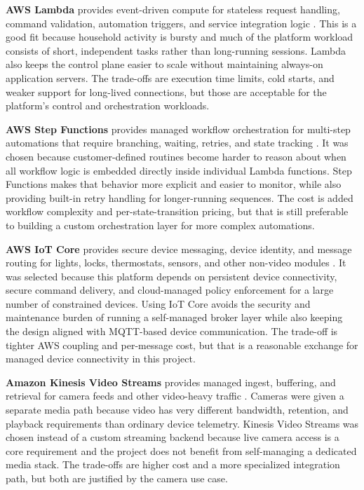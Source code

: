 \textbf{AWS Lambda} provides event-driven compute for stateless request handling, command validation, automation triggers, and service integration logic \cite{aws-lambda}. This is a good fit because household activity is bursty and much of the platform workload consists of short, independent tasks rather than long-running sessions. Lambda also keeps the control plane easier to scale without maintaining always-on application servers. The trade-offs are execution time limits, cold starts, and weaker support for long-lived connections, but those are acceptable for the platform's control and orchestration workloads.

\textbf{AWS Step Functions} provides managed workflow orchestration for multi-step automations that require branching, waiting, retries, and state tracking \cite{aws-step-functions}. It was chosen because customer-defined routines become harder to reason about when all workflow logic is embedded directly inside individual Lambda functions. Step Functions makes that behavior more explicit and easier to monitor, while also providing built-in retry handling for longer-running sequences. The cost is added workflow complexity and per-state-transition pricing, but that is still preferable to building a custom orchestration layer for more complex automations.

\textbf{AWS IoT Core} provides secure device messaging, device identity, and message routing for lights, locks, thermostats, sensors, and other non-video modules \cite{aws-iot-core}. It was selected because this platform depends on persistent device connectivity, secure command delivery, and cloud-managed policy enforcement for a large number of constrained devices. Using IoT Core avoids the security and maintenance burden of running a self-managed broker layer while also keeping the design aligned with MQTT-based device communication. The trade-off is tighter AWS coupling and per-message cost, but that is a reasonable exchange for managed device connectivity in this project.

\textbf{Amazon Kinesis Video Streams} provides managed ingest, buffering, and retrieval for camera feeds and other video-heavy traffic \cite{aws-kinesis-video-streams}. Cameras were given a separate media path because video has very different bandwidth, retention, and playback requirements than ordinary device telemetry. Kinesis Video Streams was chosen instead of a custom streaming backend because live camera access is a core requirement and the project does not benefit from self-managing a dedicated media stack. The trade-offs are higher cost and a more specialized integration path, but both are justified by the camera use case.

